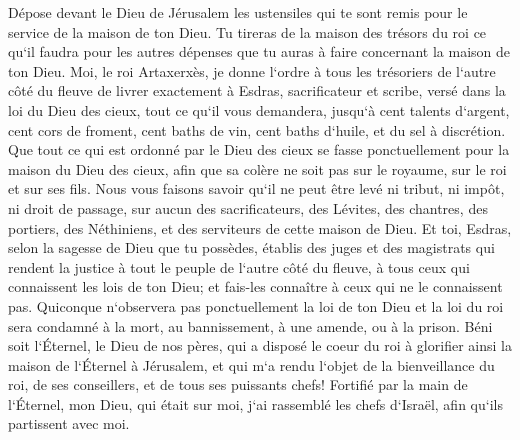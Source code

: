 \verse Dépose devant le Dieu de Jérusalem les ustensiles qui te sont remis pour le service de la maison de ton Dieu. 
\verse Tu tireras de la maison des trésors du roi ce qu`il faudra pour les autres dépenses que tu auras à faire concernant la maison de ton Dieu. 
\verse Moi, le roi Artaxerxès, je donne l`ordre à tous les trésoriers de l`autre côté du fleuve de livrer exactement à Esdras, sacrificateur et scribe, versé dans la loi du Dieu des cieux, tout ce qu`il vous demandera, 
\verse jusqu`à cent talents d`argent, cent cors de froment, cent baths de vin, cent baths d`huile, et du sel à discrétion. 
\verse Que tout ce qui est ordonné par le Dieu des cieux se fasse ponctuellement pour la maison du Dieu des cieux, afin que sa colère ne soit pas sur le royaume, sur le roi et sur ses fils. 
\verse Nous vous faisons savoir qu`il ne peut être levé ni tribut, ni impôt, ni droit de passage, sur aucun des sacrificateurs, des Lévites, des chantres, des portiers, des Néthiniens, et des serviteurs de cette maison de Dieu. 
\verse Et toi, Esdras, selon la sagesse de Dieu que tu possèdes, établis des juges et des magistrats qui rendent la justice à tout le peuple de l`autre côté du fleuve, à tous ceux qui connaissent les lois de ton Dieu; et fais-les connaître à ceux qui ne le connaissent pas. 
\verse Quiconque n`observera pas ponctuellement la loi de ton Dieu et la loi du roi sera condamné à la mort, au bannissement, à une amende, ou à la prison. 
\verse Béni soit l`Éternel, le Dieu de nos pères, qui a disposé le coeur du roi à glorifier ainsi la maison de l`Éternel à Jérusalem, 
\verse et qui m`a rendu l`objet de la bienveillance du roi, de ses conseillers, et de tous ses puissants chefs! Fortifié par la main de l`Éternel, mon Dieu, qui était sur moi, j`ai rassemblé les chefs d`Israël, afin qu`ils partissent avec moi. 

